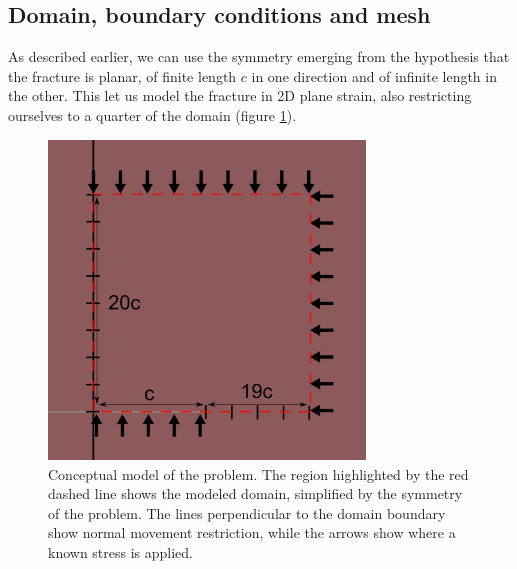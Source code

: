 \documentclass{article}
\begin{document}
\subsection{Domain, boundary conditions and mesh}
As described earlier, we can use the symmetry emerging from the hypothesis that the fracture is planar, of finite length $c$ in one direction and of infinite length in the other. This let us model the fracture in 2D plane strain, also restricting ourselves to a quarter of the domain (figure \ref{fig:domain}). 
%
\begin{figure}[h]
    \centering
    \includegraphics[width=0.75\textwidth]{fracture_boundaries}
    \caption{Conceptual model of the problem. The region highlighted by the red dashed line shows the modeled domain, simplified by the symmetry of the problem. The lines perpendicular to the domain boundary show normal movement restriction, while the arrows show where a known stress is applied.}
    \label{fig:domain}
\end{figure}
%
\end{document}
